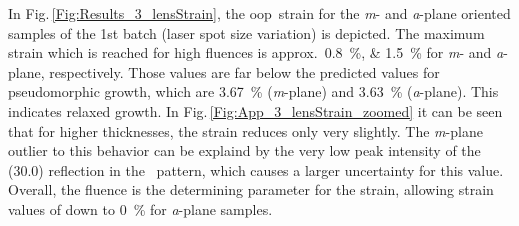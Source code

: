 In Fig.\,\ref{Fig:Results_3_lensStrain}, the \gls{oop}\ strain for the \textit{m}- and \textit{a}-plane oriented samples of the 1st batch (laser spot size variation) is depicted.
The maximum strain which is reached for high fluences is approx.\ \qtylist{0.8;1.5}{\percent} for \textit{m}- and \textit{a}-plane, respectively.
Those values are far below the predicted values for pseudomorphic growth, which are \qty{3.67}{\percent} (\textit{m}-plane) and \qty{3.63}{\percent} (\textit{a}-plane).
This indicates relaxed growth.
In Fig.\,\ref{Fig:App_3_lensStrain_zoomed} it can be seen that for higher thicknesses, the strain reduces only very slightly.
The \textit{m}-plane outlier to this behavior can be explaind by the very low peak intensity of the (30.0) reflection in the \thetaomega\ pattern, which causes a larger uncertainty for this value.
Overall, the fluence is the determining parameter for the strain, allowing strain values of down to \qty{0}{\percent} for \textit{a}-plane samples.

